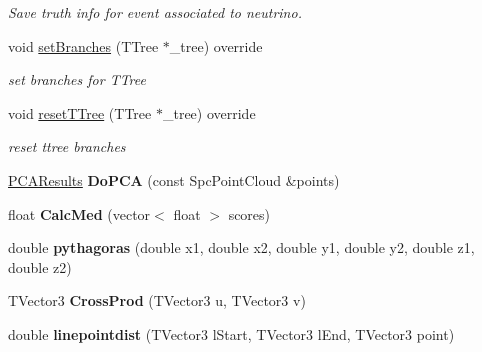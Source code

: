 \begin{DoxyCompactItemize}
\begin{DoxyCompactList}\small\item\em Save truth info for event associated to neutrino. \end{DoxyCompactList}\item 
void \hyperlink{classanalysis_1_1MCS_a311154bf681d74fe14ab7bb4a7119feb}{set\+Branches} (T\+Tree $\ast$\+\_\+tree) override\hypertarget{classanalysis_1_1MCS_a311154bf681d74fe14ab7bb4a7119feb}{}\label{classanalysis_1_1MCS_a311154bf681d74fe14ab7bb4a7119feb}

\begin{DoxyCompactList}\small\item\em set branches for T\+Tree \end{DoxyCompactList}\item 
void \hyperlink{classanalysis_1_1MCS_a1bd7d6a1cf613e0aa704b695e66a93e4}{reset\+T\+Tree} (T\+Tree $\ast$\+\_\+tree) override\hypertarget{classanalysis_1_1MCS_a1bd7d6a1cf613e0aa704b695e66a93e4}{}\label{classanalysis_1_1MCS_a1bd7d6a1cf613e0aa704b695e66a93e4}

\begin{DoxyCompactList}\small\item\em reset ttree branches \end{DoxyCompactList}\item 
\hyperlink{structPCAResults}{P\+C\+A\+Results} {\bfseries Do\+P\+CA} (const Spc\+Point\+Cloud \&points)\hypertarget{classanalysis_1_1MCS_a8bd7cb3e806464a7b2af51337a71c659}{}\label{classanalysis_1_1MCS_a8bd7cb3e806464a7b2af51337a71c659}

\item 
float {\bfseries Calc\+Med} (vector$<$ float $>$ scores)\hypertarget{classanalysis_1_1MCS_a6eeeeec44763743d3c22001e637683bf}{}\label{classanalysis_1_1MCS_a6eeeeec44763743d3c22001e637683bf}

\item 
double {\bfseries pythagoras} (double x1, double x2, double y1, double y2, double z1, double z2)\hypertarget{classanalysis_1_1MCS_a63fb825879e7f8c1b72acc07657e6512}{}\label{classanalysis_1_1MCS_a63fb825879e7f8c1b72acc07657e6512}

\item 
T\+Vector3 {\bfseries Cross\+Prod} (T\+Vector3 u, T\+Vector3 v)\hypertarget{classanalysis_1_1MCS_ac0eca12d793f9735c0fdc2ba4c8a7f5a}{}\label{classanalysis_1_1MCS_ac0eca12d793f9735c0fdc2ba4c8a7f5a}

\item 
double {\bfseries linepointdist} (T\+Vector3 l\+Start, T\+Vector3 l\+End, T\+Vector3 point)\hypertarget{classanalysis_1_1MCS_ac39429b876985f97148228de2968fa3e}{}\label{classanalysis_1_1MCS_ac39429b876985f97148228de2968fa3e}


\end{DoxyCompactItemize}
